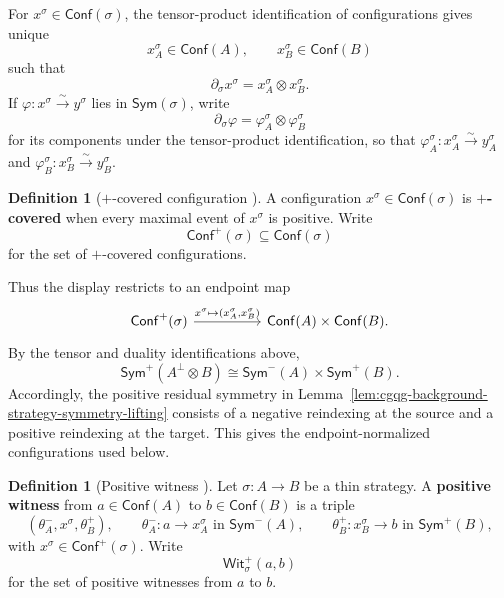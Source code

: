 \documentclass[oneside]{article}
\newcommand{\Conf}{\mathsf{Conf}}
\newcommand{\Sym}{\mathsf{Sym}}
\newcommand{\Wit}{\mathsf{Wit}}
\theoremstyle{plain}
\theoremstyle{definition}
\newtheorem{definition}[theorem]{Definition}
\theoremstyle{remark}
\begin{document}
For \(x^\sigma\in\Conf(\sigma)\), the tensor-product identification of configurations gives unique
\[
    x_A^\sigma\in\Conf(A),
    \qquad
    x_B^\sigma\in\Conf(B)
\]
such that
\[
    \partial_\sigma x^\sigma
    =
    x_A^\sigma\otimes x_B^\sigma.
\]
If \(\varphi:x^\sigma\xrightarrow{\sim}y^\sigma\) lies in \(\Sym(\sigma)\), write
\[
    \partial_\sigma\varphi
    =
    \varphi_A^\sigma\otimes\varphi_B^\sigma
\]
for its components under the tensor-product identification, so that
\(\varphi_A^\sigma:x_A^\sigma\xrightarrow{\sim}y_A^\sigma\) and
\(\varphi_B^\sigma:x_B^\sigma\xrightarrow{\sim}y_B^\sigma\).

\begin{definition}[\(+\)-covered configuration
{\cite[\S4.1.4]{ClairambaultOlimpieriPaquet2025}}]
\label{def:cgqg-background-plus-covered}
    A configuration \(x^\sigma\in\Conf(\sigma)\) is \textbf{\(+\)-covered} when every maximal event of \(x^\sigma\) is positive. Write
    \[
        \Conf^+(\sigma)\subseteq\Conf(\sigma)
    \]
    for the set of \(+\)-covered configurations.
\end{definition}

Thus the display restricts to an endpoint map
\begin{equation*}
    \begin{tikzcd}[column sep=huge]
        \Conf^+(\sigma)
          \arrow[r,"{x^\sigma\mapsto(x_A^\sigma,x_B^\sigma)}"]
        & \Conf(A)\times\Conf(B).
    \end{tikzcd}
\end{equation*}
By the tensor and duality identifications above,
\[
    \Sym^+(A^\perp\otimes B)
    \cong
    \Sym^-(A)\times\Sym^+(B).
\]
Accordingly, the positive residual symmetry in Lemma~\ref{lem:cgqg-background-strategy-symmetry-lifting} consists of a negative reindexing at the source and a positive reindexing at the target. This gives the endpoint-normalized configurations used below.

\begin{definition}[Positive witness {\cite[\S5.2]{ClairambaultOlimpieriPaquet2025}}]
\label{def:cgqg-background-positive-witness}
    Let \(\sigma:A\to B\) be a thin strategy. A \textbf{positive witness} from \(a\in\Conf(A)\) to \(b\in\Conf(B)\) is a triple
    \begin{equation}
        (\theta_A^-,x^\sigma,\theta_B^+),
        \qquad
        \theta_A^-:
        a\longrightarrow x_A^\sigma
        \text{ in }\Sym^-(A),
        \qquad
        \theta_B^+:
        x_B^\sigma\longrightarrow b
        \text{ in }\Sym^+(B),
    \label{eq:cgqg-background-positive-witness}
    \end{equation}
    with \(x^\sigma\in\Conf^+(\sigma)\). Write
    \[
        \Wit_\sigma^+(a,b)
    \]
    for the set of positive witnesses from \(a\) to \(b\).
\end{definition}
\end{document}
